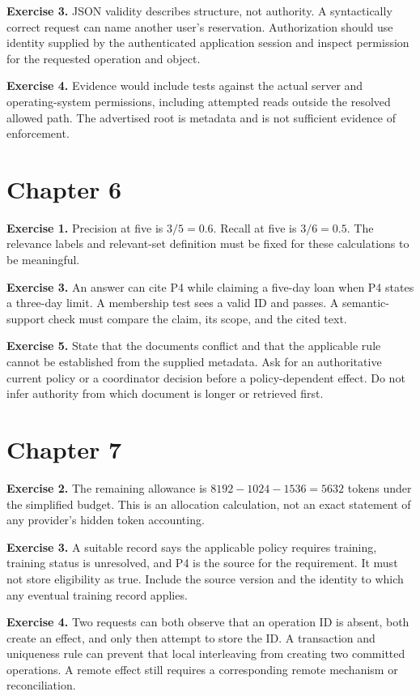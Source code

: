 \textbf{Exercise 3.} JSON validity describes structure, not authority. A syntactically correct request can name another user's reservation. Authorization should use identity supplied by the authenticated application session and inspect permission for the requested operation and object.

\textbf{Exercise 4.} Evidence would include tests against the actual server and operating-system permissions, including attempted reads outside the resolved allowed path. The advertised root is metadata and is not sufficient evidence of enforcement.

\section{Chapter 6}
\textbf{Exercise 1.} Precision at five is \(3/5=0.6\). Recall at five is \(3/6=0.5\). The relevance labels and relevant-set definition must be fixed for these calculations to be meaningful.

\textbf{Exercise 3.} An answer can cite P4 while claiming a five-day loan when P4 states a three-day limit. A membership test sees a valid ID and passes. A semantic-support check must compare the claim, its scope, and the cited text.

\textbf{Exercise 5.} State that the documents conflict and that the applicable rule cannot be established from the supplied metadata. Ask for an authoritative current policy or a coordinator decision before a policy-dependent effect. Do not infer authority from which document is longer or retrieved first.

\section{Chapter 7}
\textbf{Exercise 2.} The remaining allowance is \(8192-1024-1536=5632\) tokens under the simplified budget. This is an allocation calculation, not an exact statement of any provider's hidden token accounting.

\textbf{Exercise 3.} A suitable record says the applicable policy requires training, training status is unresolved, and P4 is the source for the requirement. It must not store eligibility as true. Include the source version and the identity to which any eventual training record applies.

\textbf{Exercise 4.} Two requests can both observe that an operation ID is absent, both create an effect, and only then attempt to store the ID. A transaction and uniqueness rule can prevent that local interleaving from creating two committed operations. A remote effect still requires a corresponding remote mechanism or reconciliation.

